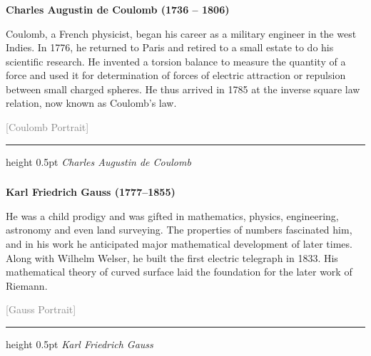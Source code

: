 \begin{frame}[t]
	\frametitle{}
	
	\noindent
	\textbf{Charles Augustin de Coulomb (1736 – 1806)}
	
	\vspace{0.5em}
	
	\noindent
	\begin{minipage}[t]{0.7\textwidth}
		\small
		Coulomb, a French physicist, began his career as a military engineer in the west Indies. In 1776, he returned to Paris and retired to a small estate to do his scientific research. He invented a torsion balance to measure the quantity of a force and used it for determination of forces of electric attraction or repulsion between small charged spheres. He thus arrived in 1785 at the inverse square law relation, now known as Coulomb's law.
	\end{minipage}%
	\hfill
	\begin{minipage}[t]{0.25\textwidth}
		\centering
		\textcolor{gray}{\small [Coulomb Portrait]}
		\vspace{-0.5em}
		\hrule height 0.5pt
		\vspace{0.2em}
		\scriptsize \textit{Charles Augustin de Coulomb}
	\end{minipage}
	
\end{frame}
\begin{frame}[t]
	\frametitle{}
	
	\noindent
	\textbf{Karl Friedrich Gauss (1777–1855)}
	
	\vspace{0.5em}
	
	\noindent
	\begin{minipage}[t]{0.7\textwidth}
		\small
		He was a child prodigy and was gifted in mathematics, physics, engineering, astronomy and even land surveying. The properties of numbers fascinated him, and in his work he anticipated major mathematical development of later times. Along with Wilhelm Welser, he built the first electric telegraph in 1833. His mathematical theory of curved surface laid the foundation for the later work of Riemann.
	\end{minipage}%
	\hfill
	\begin{minipage}[t]{0.25\textwidth}
		\centering
		\textcolor{gray}{\small [Gauss Portrait]}
		\vspace{-0.5em}
		\hrule height 0.5pt
		\vspace{0.2em}
		\scriptsize \textit{Karl Friedrich Gauss}
	\end{minipage}
	
\end{frame}
